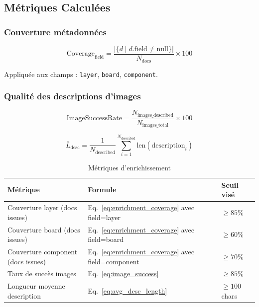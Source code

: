 \documentclass[a4paper,12pt]{article}
\begin{document}
\subsection{Métriques Calculées}

\subsubsection{Couverture métadonnées}

\begin{equation}
\text{Coverage}_{\text{field}} = \frac{|\{d \mid d.\text{field} \neq \text{null}\}|}{N_{\text{docs}}} \times 100
\label{eq:enrichment_coverage}
\end{equation}

Appliquée aux champs : \texttt{layer}, \texttt{board}, \texttt{component}.

\subsubsection{Qualité des descriptions d'images}

\begin{equation}
\text{ImageSuccessRate} = \frac{N_{\text{images\_described}}}{N_{\text{images\_total}}} \times 100
\label{eq:image_success}
\end{equation}

\begin{equation}
\overline{L}_{\text{desc}} = \frac{1}{N_{\text{described}}} \sum_{i=1}^{N_{\text{described}}} \text{len}(\text{description}_i)
\label{eq:avg_desc_length}
\end{equation}

\begin{table}[H]
\centering
\caption{Métriques d'enrichissement}
\label{tab:enrichment}
\begin{tabular}{>{\raggedright}p{5.5cm} p{5.5cm} p{3cm}}
\toprule
\textbf{Métrique} & \textbf{Formule} & \textbf{Seuil visé} \\
\midrule
Couverture layer (docs issues) & Eq.~\ref{eq:enrichment_coverage} avec field=layer & $\geq 85\%$ \\
Couverture board (docs issues) & Eq.~\ref{eq:enrichment_coverage} avec field=board & $\geq 60\%$ \\
Couverture component (docs issues) & Eq.~\ref{eq:enrichment_coverage} avec field=component & $\geq 70\%$ \\
Taux de succès images & Eq.~\ref{eq:image_success} & $\geq 85\%$ \\
Longueur moyenne description & Eq.~\ref{eq:avg_desc_length} & $\geq 100$ chars \\
\bottomrule
\end{tabular}
\end{table}
\end{document}
